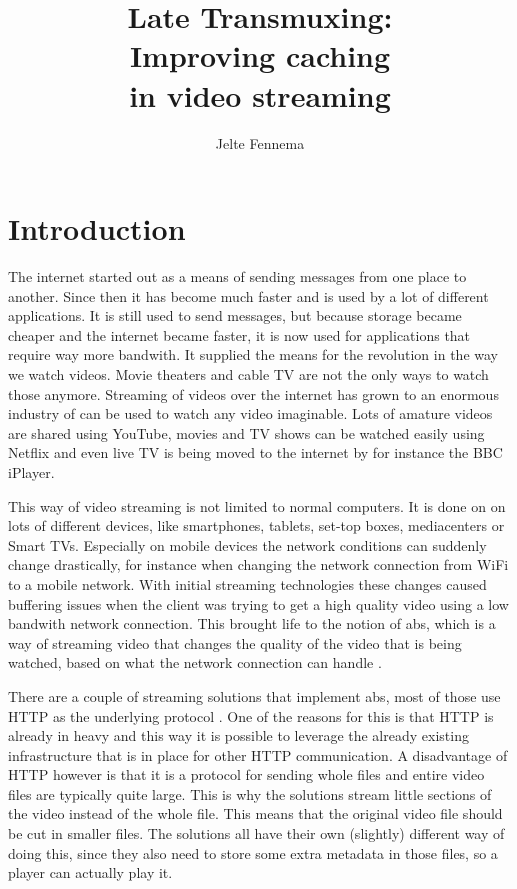 \documentclass[twoside,openright]{uva-bachelor-thesis}
\title{Late Transmuxing:\\Improving caching \\in video streaming}
\author{Jelte Fennema}
\begin{document}
\maketitle

\begin{abstract}
\end{abstract}


\tableofcontents

\chapter{Introduction}
The internet started out as a means of sending messages from one place to
another. Since then it has become much faster and is used by a lot of different
applications. It is still used to send messages, but because storage became
cheaper and the internet became faster, it is now used for applications that
require way more bandwith. It supplied the means for the revolution in the way
we watch videos. Movie theaters and cable TV are not the only ways to watch
those anymore. Streaming of videos over the internet has grown to an enormous
industry of can be used to watch any video imaginable. Lots of amature videos
are shared using YouTube, movies and TV shows can be watched easily using
Netflix and even live TV is being moved to the internet by for instance the BBC
iPlayer.

This way of video streaming is not limited to normal computers. It is done on on
lots of different devices, like smartphones, tablets, set-top boxes,
mediacenters or Smart TVs. Especially on mobile devices the network conditions
can suddenly change drastically, for instance when changing the network
connection from WiFi to a mobile network. With initial streaming technologies
these changes caused buffering issues when the client was trying to get a high
quality video using a low bandwith network connection. This brought life to the
notion of \gls{abs}, which is a way of streaming video that changes the quality
of the video that is being watched, based on what the network connection can
handle \autocite{abs}.

There are a couple of streaming solutions that implement
\gls{abs}, most of those use HTTP as the underlying protocol \autocite{http}.
One of the reasons for this is that HTTP is already in heavy and this way it is
possible to leverage the already existing infrastructure that is in place for
other HTTP communication. A disadvantage of HTTP however is that it is a
protocol for sending whole files and entire video files are typically quite
large. This is why the solutions stream little sections of the video instead of
the whole file. This means that the original video file should be cut in smaller
files. The solutions all have their own (slightly) different way of doing this,
since they also need to store some extra metadata in those files, so a player
can actually play it.
\end{document}
